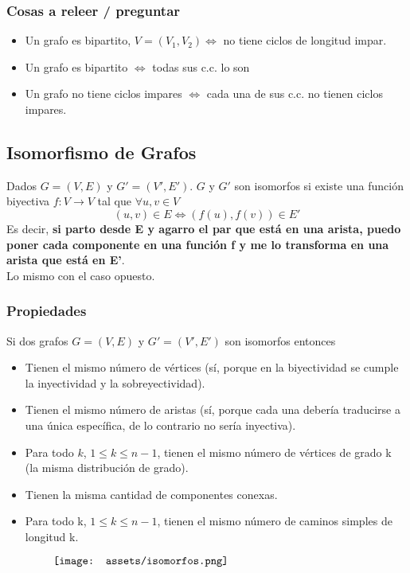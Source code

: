 \documentclass[10pt,a4paper]{article}
\begin{document}
\subsubsection*{Cosas a releer / preguntar}
\begin{itemize}
    \item Un grafo es bipartito, $V = (V_{1}, V_{2}) \iff$ no tiene ciclos de longitud impar.
    \item Un grafo es bipartito $\iff$ todas sus c.c. lo son 
    \item Un grafo no tiene ciclos impares $\iff$ cada una de sus c.c. no tienen ciclos impares.
\end{itemize}
\subsection*{Isomorfismo de Grafos}
Dados  $G = (V, E)$ y $G' = (V', E')$. $G$ y $G'$ son isomorfos si existe una función biyectiva $f: V \rightarrow V$ tal que $\forall u,v \in V$ 
\[(u,v) \in E \iff (f(u), f(v)) \in E'\]
Es decir, \textbf{si parto desde E y agarro el par que está en una arista, puedo poner cada componente en una función f y me lo transforma en una arista que está en E'}. \\
Lo mismo con el caso opuesto.
\subsubsection*{Propiedades}
Si dos grafos $G = (V,E)$ y $G' = (V', E')$ son isomorfos entonces
\begin{itemize}
    \item Tienen el mismo número de vértices (sí, porque en la biyectividad se cumple la inyectividad y la sobreyectividad).
    \item Tienen el mismo número de aristas (sí, porque cada una debería traducirse a una única específica, de lo contrario no sería inyectiva).
    \item Para todo $k$, $1 \le k \le n-1$, tienen el mismo número de vértices de grado k (la misma distribución de grado).
    \item Tienen la misma cantidad de componentes conexas.
    \item Para todo k, $1 \le k \le n-1$, tienen el mismo número de caminos simples de longitud k.
\end{itemize}
\[\begin{minipage}[b]{0.8\textwidth}
    \texttt{[image: assets/isomorfos.png]}
\end{minipage}\]
\end{document}
